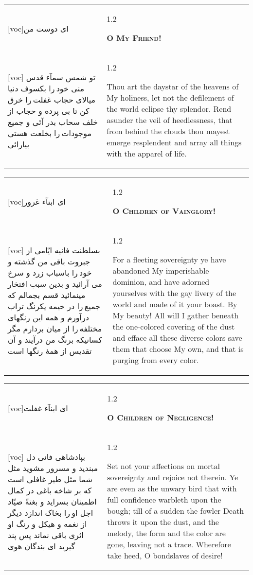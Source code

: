 \documentclass[11pt]{article}
\makeatletter
\newenvironment{orig}
  {\begin{farsi}[voc]}
  {\end{farsi}}
\newenvironment{trans}
  {\Large\begin{spacing}{1.2}\raggedright}
  {\end{spacing}}
\newenvironment{word}
  {\begin{tabular}[t]{p{2.75in}@{\hspace{3em}}p{2.75in}}}
  {\end{tabular}}
\newcommand{\ayat}[2]{\begin{orig}#1\end{orig} & \begin{trans}#2\end{trans}}
\newcommand{\heading}[2]{\textsc{\textbf{#1}} %
}
\makeatother
\begin{document}
\pagebreak

\begin{word}
\ayat{ای دوست من}{\heading{O My Friend!}{}} \\ \ayat{
تو شمس سمآء قدس منی خود را بکسوف دنيا ميالای
حجاب غفلت را خرق کن تا بی پرده و حجاب از خلف سحاب بدر آئی و جميع موجودات را بخلعت هستی بيارائی
}{
  Thou art the daystar of the heavens of My holiness, let not the defilement
  of the world eclipse thy splendor. Rend asunder the veil of heedlessness,
  that from behind the clouds thou mayest emerge resplendent and array all
  things with the apparel of life.
}
\end{word}

\pagebreak

\begin{word}
\ayat{ای ابنآء غرور}{\heading{O Children of Vainglory!}{}} \\ \ayat{
بسلطنت فانيه ايّامی از جبروت باقی من گذشته و خود را باسباب زرد و سرخ می آرائيد و بدين سبب افتخار مينمائيد
قسم بجمالم که جميع را در خيمه يکرنگ تراب درآورم و همه اين رنگهای مختلفه را از ميان بردارم مگر کسانيکه برنگ من درآيند و آن تقديس از همۀ رنگها است
}{
  For a fleeting sovereignty ye have abandoned My imperishable dominion, and
  have adorned yourselves with the gay livery of the world and made of it your
  boast. By My beauty! All will I gather beneath the one-colored covering of
  the dust and efface all these diverse colors save them that choose My own,
  and that is purging from every color.
}
\end{word}

\pagebreak

\begin{word}
\ayat{ای ابنآء غفلت}{\heading{O Children of Negligence!}{}} \\ \ayat{
بپادشاهی فانی دل مبنديد و مسرور مشويد
مثل شما مثل طير غافلی است که بر شاخه باغی در کمال اطمينان بسرايد و بغتةً صيّاد اجل او را بخاک اندازد ديگر از نغمه و هيکل و رنگ او اثری باقی نماند
پس پند گيريد ای بندگان هوی
}{
  Set not your affections on mortal sovereignty and rejoice not therein. Ye
  are even as the unwary bird that with full confidence warbleth upon the
  bough; till of a sudden the fowler Death throws it upon the dust, and the
  melody, the form and the color are gone, leaving not a trace. Wherefore take
  heed, O bondslaves of desire!
}
\end{word}

\pagebreak
\end{document}
